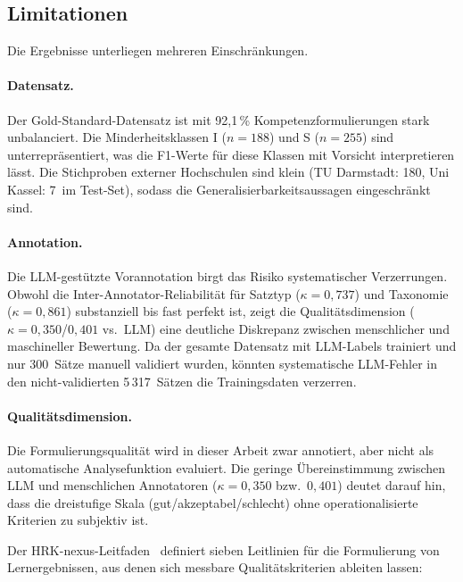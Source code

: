 \subsection{Limitationen}\label{sec:limitationen}

Die Ergebnisse unterliegen mehreren Einschränkungen.

\paragraph{Datensatz.}
Der Gold-Standard-Datensatz ist mit 92{,}1\,\% Kompetenzformulierungen stark unbalanciert.
Die Minderheitsklassen I ($n = 188$) und S ($n = 255$) sind unterrepräsentiert, was die F1-Werte für diese Klassen mit Vorsicht interpretieren lässt.
Die Stichproben externer Hochschulen sind klein (TU Darmstadt: 180, Uni Kassel: 7~im Test-Set), sodass die Generalisierbarkeitsaussagen eingeschränkt sind.

\paragraph{Annotation.}
Die LLM-gestützte Vorannotation birgt das Risiko systematischer Verzerrungen.
Obwohl die Inter-Annotator-Reliabilität für Satztyp ($\kappa = 0{,}737$) und Taxonomie ($\kappa = 0{,}861$) substanziell bis fast perfekt ist, zeigt die Qualitätsdimension ($\kappa = 0{,}350$/$0{,}401$ vs.\ LLM) eine deutliche Diskrepanz zwischen menschlicher und maschineller Bewertung.
Da der gesamte Datensatz mit LLM-Labels trainiert und nur 300~Sätze manuell validiert wurden, könnten systematische LLM-Fehler in den nicht-validierten 5\,317~Sätzen die Trainingsdaten verzerren.

\paragraph{Qualitätsdimension.}
Die Formulierungsqualität wird in dieser Arbeit zwar annotiert, aber nicht als automatische Analysefunktion evaluiert.
Die geringe Übereinstimmung zwischen LLM und menschlichen Annotatoren ($\kappa = 0{,}350$ bzw.\ $0{,}401$) deutet darauf hin, dass die dreistufige Skala (gut/akzeptabel/schlecht) ohne operationalisierte Kriterien zu subjektiv ist.

Der HRK-nexus-Leitfaden~\cite{hrknexus2015lernergebnisse} definiert sieben Leitlinien für die Formulierung von Lernergebnissen, aus denen sich messbare Qualitätskriterien ableiten lassen:

